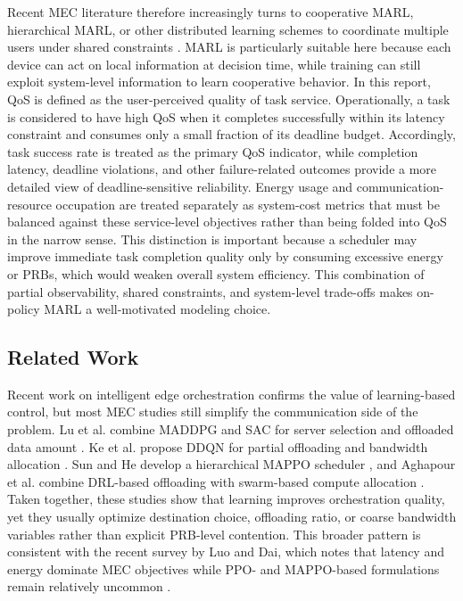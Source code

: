 Recent MEC literature therefore increasingly turns to cooperative MARL, hierarchical MARL, or other distributed learning schemes to coordinate multiple users under shared constraints \cite{lu2020mec_maddpg_sac, ke2022demadrl, sun2023hdmappo, robles2023multilayer}. MARL is particularly suitable here because each device can act on local information at decision time, while training can still exploit system-level information to learn cooperative behavior. In this report, QoS is defined as the user-perceived quality of task service. Operationally, a task is considered to have high QoS when it completes successfully within its latency constraint and consumes only a small fraction of its deadline budget. Accordingly, task success rate is treated as the primary QoS indicator, while completion latency, deadline violations, and other failure-related outcomes provide a more detailed view of deadline-sensitive reliability. Energy usage and communication-resource occupation are treated separately as system-cost metrics that must be balanced against these service-level objectives rather than being folded into QoS in the narrow sense. This distinction is important because a scheduler may improve immediate task completion quality only by consuming excessive energy or PRBs, which would weaken overall system efficiency. This combination of partial observability, shared constraints, and system-level trade-offs makes on-policy MARL a well-motivated modeling choice.

\subsection{Related Work}
\label{subsec:intro-related}

Recent work on intelligent edge orchestration confirms the value of learning-based control, but most MEC studies still simplify the communication side of the problem. Lu et al. combine MADDPG and SAC for server selection and offloaded data amount \cite{lu2020mec_maddpg_sac}. Ke et al. propose DDQN for partial offloading and bandwidth allocation \cite{ke2022demadrl}. Sun and He develop a hierarchical MAPPO scheduler \cite{sun2023hdmappo}, and Aghapour et al. combine DRL-based offloading with swarm-based compute allocation \cite{aghapour2023offloading}. Taken together, these studies show that learning improves orchestration quality, yet they usually optimize destination choice, offloading ratio, or coarse bandwidth variables rather than explicit PRB-level contention. This broader pattern is consistent with the recent survey by Luo and Dai, which notes that latency and energy dominate MEC objectives while PPO- and MAPPO-based formulations remain relatively uncommon \cite{luo2024survey}.

